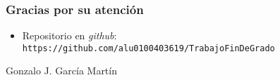 \begin{frame} [fragile]
  \frametitle{Gracias por su atención}
  \block{\SchollApp}
    \begin{itemize}
    \item Repositorio en {\it github}: \texttt{https://github.com/alu0100403619/TrabajoFinDeGrado}
    \end{itemize}
    \begin{flushright}
    Gonzalo J. García Martín  \\
    \end{flushright}
  \endblock{}
\end{frame}